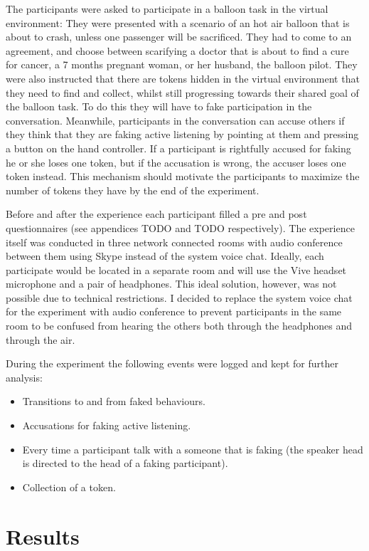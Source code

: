 \documentclass[]{simple-thesis}
\begin{document}
The participants were asked to participate in a balloon task \citep{Howes2012} in the virtual environment:
They were presented with a scenario of an hot air balloon that is about to crash, unless one passenger will be sacrificed.
They had to come to an agreement, and choose between scarifying a doctor that is about to find a cure for cancer, a 7 months pregnant woman, or her husband, the balloon pilot.
They were also instructed that there are tokens hidden in the virtual environment that they need to find and collect, whilst still progressing towards their shared goal of the balloon task.
To do this they will have to fake participation in the conversation.
Meanwhile, participants in the conversation can accuse others if they think that they are faking active listening by pointing at them and pressing a button on the hand controller.
If a participant is rightfully accused for faking he or she loses one token, but if the accusation is wrong, the accuser loses one token instead.
This mechanism should motivate the participants to maximize the number of tokens they have by the end of the experiment.

Before and after the experience each participant filled a pre and post questionnaires (see appendices TODO and TODO respectively).
The experience itself was conducted in three network connected rooms with audio conference between them using Skype instead of the system voice chat.
Ideally, each participate would be located in a separate room and will use the Vive headset microphone and a pair of headphones.
This ideal solution, however, was not possible due to technical restrictions.
I decided to replace the system voice chat for the experiment with audio conference to prevent participants in the same room to be confused from hearing the others both through the headphones and through the air.

During the experiment the following events were logged and kept for further analysis:

\begin{itemize}
  \item Transitions to and from faked behaviours.
  \item Accusations for faking active listening.
  \item Every time a participant talk with a someone that is faking (the speaker head is directed to the head of a faking participant).
  \item Collection of a token.
\end{itemize}

\section{Results}
\end{document}
